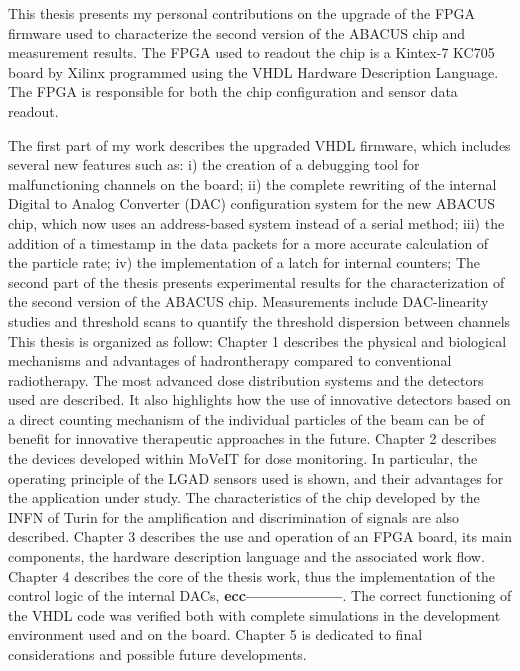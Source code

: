 This thesis presents my personal contributions on the upgrade of the FPGA firmware used to characterize
the second version of the ABACUS chip and measurement results.
The FPGA used to readout the chip is a Kintex-7 KC705 board by Xilinx programmed using the VHDL Hardware Description Language. The FPGA
is responsible for both the chip configuration and sensor data readout.

\noindent The first part of my work describes the upgraded VHDL firmware, which includes several new features such as:
i) the creation of a debugging tool for malfunctioning channels on the board;
ii) the complete rewriting of the internal Digital to Analog Converter (DAC) configuration system for the new ABACUS chip, which
now uses an address-based system instead of a serial method;
iii) the addition of a timestamp in the data packets for a more accurate calculation of the particle rate;
iv) the implementation of a latch for internal counters;
\newline
The second part of the thesis presents experimental results for the characterization of the second version of the ABACUS chip.
Measurements include DAC-linearity studies and threshold scans to quantify the threshold dispersion between channels
\vspace{1cm}
\newline
This thesis is organized as follow:
\vspace{0.25cm}
\newline
Chapter 1 describes the physical and biological mechanisms and advantages of hadrontherapy compared to conventional radiotherapy. The most advanced dose distribution systems and the detectors used are described. It also highlights how the use of innovative detectors based on a direct counting mechanism of the individual particles of the beam can be of benefit for innovative therapeutic approaches in the future.
\vspace{0.25cm}
\newline
Chapter 2 describes the devices developed within MoVeIT for dose monitoring. In particular, the operating principle of the LGAD sensors used is shown, and their advantages for the application under study. The characteristics of the chip developed by the INFN of Turin for the amplification and discrimination of signals are also described.
\vspace{0.25cm}
\newline
Chapter 3 describes the use and operation of an FPGA board, its main components, the hardware description language and the associated work flow.
\vspace{0.25cm}
\newline
Chapter 4 describes the core of the thesis work, thus the implementation of the control logic of the internal DACs, \textbf{ecc------------------}. The correct functioning of the VHDL code was verified both with complete simulations in the development environment used and on the board.
\vspace{0.25cm}
\newline
Chapter 5 is dedicated to final considerations and possible future developments.
